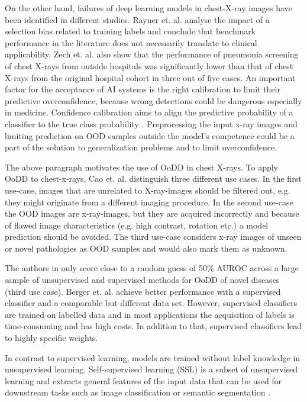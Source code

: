 On the other hand, failures of deep learning models in chest-X-ray images have been identified in different studies.
Rayner et. al. \citep{Rayner2019} analyse the impact of a selection bias related to training labels and conclude that benchmark performance in the literature does not necessarily translate to clinical applicability.
Zech et. al. \citep{Zech2018} also show that the performance of pneumonia screening of chest X-rays from outside hospitals was significantly lower than that of chest X-rays from the original hospital cohort in three out of five cases.
An important factor for the acceptance of AI systems is the right calibration to limit their predictive overconfidence, because wrong detections could be dangerous especially in medicine.
Confidence calibration aims to align the predictive probability of a classifier to the true class probability \citep{Guo2017}.
Preprocessing the input x-ray images and limiting prediction on OOD samples outside the model's competence could be a part of the solution to generalization problems and to limit overconfidence.
\par
The above paragraph motivates the use of OoDD in chest X-rays.
To apply OoDD to chest-x-rays, Cao et. al. \citep{Cao2020} distinguish three different use cases.
In the first use-case, images that are unrelated to X-ray-images should be filtered out, e.g. they might originate from a different imaging procedure.
In the second use-case the OOD images are x-ray-images, but they are acquired incorrectly and because of flawed image characteristics (e.g. high contrast, rotation etc.) a model prediction should be avoided.
The third use-case considers x-ray images of unseen or novel pathologies as OOD samples and would also mark them as unknown.
\par
The authors in \citep{Cao2020} only score close to a random guess of 50\% AUROC across a large sample of unsupervised and supervised methods for OoDD of novel diseases (third use case).
Berger et. al. \citep{Berger2021} achieve better performance with a supervised classifier and a comparable but different data set.
However, supervised classifiers are trained on labelled data and in most applications the acquisition of labels is time-consuming and has high costs.
In addition to that, supervised classifiers lead to highly specific weights.
\par
In contrast to supervised learning, models are trained without label knowledge in unsupervised learning.
Self-supervised learning (SSL) is a subset of unsupervised learning and extracts general features of the input data that can be used for downstream tasks such as image classification or semantic segmentation \citep{Jing2019}.
